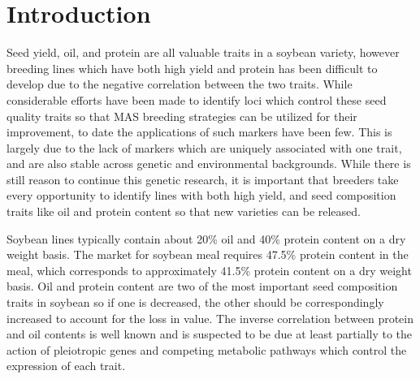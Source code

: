 \documentclass[Agronomy,article,submit,moreauthors,pdftex]{mdpi}
\begin{document}

\hypertarget{introduction}{%
\section{Introduction}\label{introduction}}

Seed yield, oil, and protein are all valuable traits in a soybean
variety, however breeding lines which have both high yield and protein
has been difficult to develop due to the negative correlation between
the two
traits\citep{burton1987quantitative, ProtOilCorr, ProtOilCorr_new}.
While considerable efforts have been made to identify loci which control
these seed quality traits so that MAS breeding strategies can be
utilized for their improvement, to date the applications of such markers
have been few. This is largely due to the lack of markers which are
uniquely associated with one trait, and are also stable across genetic
and environmental backgrounds. While there is still reason to continue
this genetic research, it is important that breeders take every
opportunity to identify lines with both high yield, and seed composition
traits like oil and protein content so that new varieties can be
released.

Soybean lines typically contain about 20\% oil and 40\% protein content
on a dry weight basis\citep{ProteinGenomics}. The market for soybean
meal requires 47.5\% protein content in the meal, which corresponds to
approximately 41.5\% protein content on a dry weight
basis\citep{ProteinGenomics}. Oil and protein content are two of the
most important seed composition traits in soybean so if one is
decreased, the other should be correspondingly increased to account for
the loss in value. The inverse correlation between protein and oil
contents is well known and is suspected to be due at least partially to
the action of pleiotropic genes and competing metabolic pathways which
control the expression of each trait\citep{SeedCompositionGenomics}.
\end{document}

